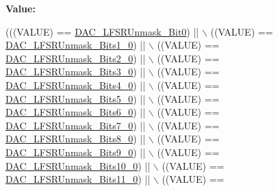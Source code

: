 {\bfseries Value\+:}
\begin{DoxyCode}
(((VALUE) == \hyperlink{group___d_a_c__lfsrunmask__triangleamplitude_ga60794fd5092a332cfa82e1cee13945fc}{DAC\_LFSRUnmask\_Bit0}) || \(\backslash\)
                                                      ((VALUE) == 
      \hyperlink{group___d_a_c__lfsrunmask__triangleamplitude_ga09f47cfa563252a1add4662284350c07}{DAC\_LFSRUnmask\_Bits1\_0}) || \(\backslash\)
                                                      ((VALUE) == 
      \hyperlink{group___d_a_c__lfsrunmask__triangleamplitude_ga60b800857b7e33d9c0be2846fc56849f}{DAC\_LFSRUnmask\_Bits2\_0}) || \(\backslash\)
                                                      ((VALUE) == 
      \hyperlink{group___d_a_c__lfsrunmask__triangleamplitude_gafe219362b3a48d8678a65ef38cb45532}{DAC\_LFSRUnmask\_Bits3\_0}) || \(\backslash\)
                                                      ((VALUE) == 
      \hyperlink{group___d_a_c__lfsrunmask__triangleamplitude_ga2543d802e19d592a26c8231be663cdac}{DAC\_LFSRUnmask\_Bits4\_0}) || \(\backslash\)
                                                      ((VALUE) == 
      \hyperlink{group___d_a_c__lfsrunmask__triangleamplitude_ga71a01660d410823bfe76a603080dc125}{DAC\_LFSRUnmask\_Bits5\_0}) || \(\backslash\)
                                                      ((VALUE) == 
      \hyperlink{group___d_a_c__lfsrunmask__triangleamplitude_ga48fe2d3f4274d6bf28e446ca0001ed5d}{DAC\_LFSRUnmask\_Bits6\_0}) || \(\backslash\)
                                                      ((VALUE) == 
      \hyperlink{group___d_a_c__lfsrunmask__triangleamplitude_gaf0a93c1ee1e13776fae7558b36243431}{DAC\_LFSRUnmask\_Bits7\_0}) || \(\backslash\)
                                                      ((VALUE) == 
      \hyperlink{group___d_a_c__lfsrunmask__triangleamplitude_ga4f56965841d9d91ca5b6de43ee589598}{DAC\_LFSRUnmask\_Bits8\_0}) || \(\backslash\)
                                                      ((VALUE) == 
      \hyperlink{group___d_a_c__lfsrunmask__triangleamplitude_gaf7f4540d9ec6efe074e1e4485f9a347a}{DAC\_LFSRUnmask\_Bits9\_0}) || \(\backslash\)
                                                      ((VALUE) == 
      \hyperlink{group___d_a_c__lfsrunmask__triangleamplitude_ga7670f0e10f062571d0e56027ef653228}{DAC\_LFSRUnmask\_Bits10\_0}) || \(\backslash\)
                                                      ((VALUE) == 
      \hyperlink{group___d_a_c__lfsrunmask__triangleamplitude_gaeb9b5992b771f9a14587eeda58227831}{DAC\_LFSRUnmask\_Bits11\_0}) || \(\backslash\)
                                                      ((VALUE) == 

\end{DoxyCode}
